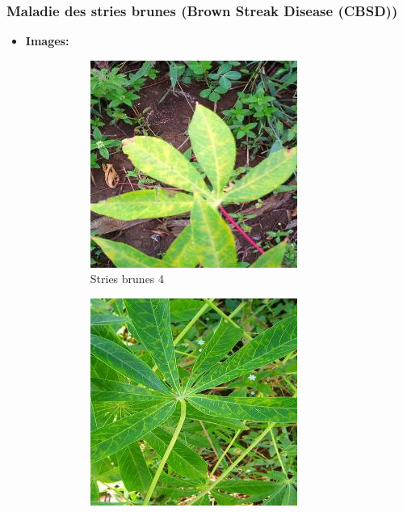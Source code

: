 \documentclass{article}
\begin{document}
	\newpage

	\subsubsection{Maladie des stries brunes (Brown Streak Disease (CBSD))}
	\begin{itemize}
		\item \textbf{Images: }
		\begin{figure}[htbp]
			\centering
			\begin{subfigure}[b]{0.3\textwidth}
				\centering
				\includegraphics[width=\textwidth]{img/4.jpg}
				\caption{Stries brunes 4}
			\end{subfigure}
			\hfill
			\begin{subfigure}[b]{0.3\textwidth}
				\centering
				\includegraphics[width=\textwidth]{img/5.jpg}

\end{subfigure}
\end{figure}
\end{itemize}
\end{document}
